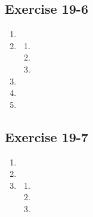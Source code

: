 \subsection{Exercise 19-6}
\begin{multicols}{4}
 \begin{enumerate}[noitemsep, label=\textbf{(\arabic*)} ]
  \item 
  \item 
\begin{enumerate}[noitemsep, label=\textbf{(\alph*)} ]
 \item 
\item
\item 
\end{enumerate}
\item
\item
\item
 \end{enumerate}
\end{multicols}

\subsection{Exercise 19-7}
\begin{multicols}{4}
 \begin{enumerate}[noitemsep, label=\textbf{(\arabic*)} ]
  \item 
\item
  \item 
\begin{enumerate}[noitemsep, label=\textbf{(\alph*)} ]
 \item 
\item
\item 
\end{enumerate}
 \end{enumerate}
\end{multicols}

